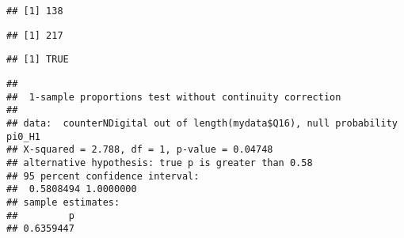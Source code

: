 \documentclass[
]{article}
\newenvironment{Shaded}{\begin{snugshade}}{\end{snugshade}}
\newcommand{\AttributeTok}[1]{\textcolor[rgb]{0.77,0.63,0.00}{#1}}
\newcommand{\CommentTok}[1]{\textcolor[rgb]{0.56,0.35,0.01}{\textit{#1}}}
\newcommand{\ConstantTok}[1]{\textcolor[rgb]{0.00,0.00,0.00}{#1}}
\newcommand{\DecValTok}[1]{\textcolor[rgb]{0.00,0.00,0.81}{#1}}
\newcommand{\FloatTok}[1]{\textcolor[rgb]{0.00,0.00,0.81}{#1}}
\newcommand{\FunctionTok}[1]{\textcolor[rgb]{0.00,0.00,0.00}{#1}}
\newcommand{\NormalTok}[1]{#1}
\newcommand{\OtherTok}[1]{\textcolor[rgb]{0.56,0.35,0.01}{#1}}
\newcommand{\SpecialCharTok}[1]{\textcolor[rgb]{0.00,0.00,0.00}{#1}}
\newcommand{\StringTok}[1]{\textcolor[rgb]{0.31,0.60,0.02}{#1}}
\begin{document}
\begin{verbatim}
## [1] 138
\end{verbatim}

\begin{Shaded}
\end{Shaded}

\begin{verbatim}
## [1] 217
\end{verbatim}

\begin{Shaded}
\end{Shaded}

\begin{verbatim}
## [1] TRUE
\end{verbatim}

\begin{Shaded}
\end{Shaded}

\begin{verbatim}
## 
##  1-sample proportions test without continuity correction
## 
## data:  counterNDigital out of length(mydata$Q16), null probability pi0_H1
## X-squared = 2.788, df = 1, p-value = 0.04748
## alternative hypothesis: true p is greater than 0.58
## 95 percent confidence interval:
##  0.5808494 1.0000000
## sample estimates:
##         p 
## 0.6359447
\end{verbatim}
\end{document}
